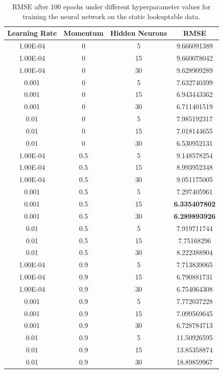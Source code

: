 \documentclass[a4paper,12pt]{article}
\begin{document}
\begin{table}[hbt!]
\centering
\begin{tabular}{c|c|c|c}
Learning Rate &  Momentum &  Hidden Neurons & RMSE\\
\hline
1.00E-04 &0 & 5 & 9.666091389\\
1.00E-04& 0 &  15 &  9.660078042\\
1.00E-04 &  0 &  30 & 9.628909289\\
0.001 &  0 &  5 &  7.632740399\\
0.001 &  0 &  15 &  6.943443362\\
0.001 &  0 &  30 &  6.711401519\\
0.01 &  0 &  5 &  7.985192317\\
0.01 &  0 &  15 &  7.018144655\\
0.01 &  0 &  30 &  6.530952131\\
1.00E-04 &  0.5 &  5 &  9.148578254\\
1.00E-04 &  0.5 &  15 &  8.993952348\\
1.00E-04 &  0.5 &  30 &  9.051175005\\
0.001 &  0.5 &  5 & 7.297405961\\
0.001 &  0.5 &  15 &  \textbf{6.335407802}\\
0.001 &  0.5 &  30 &  \textbf{6.289893926}\\
0.01 &  0.5 &  5 &  7.919711744\\
0.01 &  0.5 &  15 & 7.75168296\\
0.01 &  0.5 &  30 &  8.222388904\\
1.00E-04 &  0.9 &  5 &  7.713839065\\
1.00E-04 &  0.9 &  15 & 6.790881731\\
1.00E-04 &  0.9 &  30 & 6.754064308\\
0.001 &  0.9 &  5 &  7.772037228\\
0.001 &  0.9 &  15 &  7.099569645\\
0.001 &  0.9 &  30 &  6.728784713\\
0.01 &  0.9 &  5 &    11.50926595\\
0.01 &  0.9 &  15 &  13.85358874\\
0.01 &  0.9 &  30 &  18.89859967\\

\end{tabular}
\caption{RMSE after 100 epochs under different hyperparameter values for training the neural network on the static lookuptable data.}
\label{tbl:grid_search}
\end{table}
\end{document}
